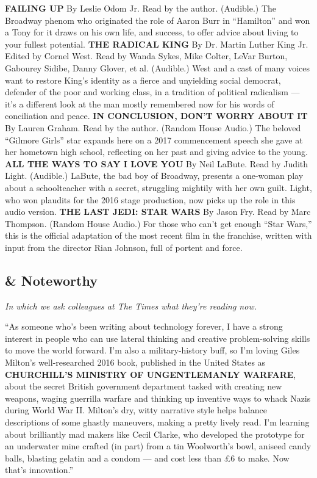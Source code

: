 \textbf{FAILING UP} By Leslie Odom Jr. Read by the author. (Audible.)
The Broadway phenom who originated the role of Aaron Burr in
``Hamilton'' and won a Tony for it draws on his own life, and success,
to offer advice about living to your fullest potential. \textbf{THE
RADICAL KING} By Dr. Martin Luther King Jr. Edited by Cornel West. Read
by Wanda Sykes, Mike Colter, LeVar Burton, Gabourey Sidibe, Danny
Glover, et al. (Audible.) West and a cast of many voices want to restore
King's identity as a fierce and unyielding social democrat, defender of
the poor and working class, in a tradition of political radicalism ---
it's a different look at the man mostly remembered now for his words of
conciliation and peace. \textbf{IN CONCLUSION, DON'T WORRY ABOUT IT} By
Lauren Graham. Read by the author. (Random House Audio.) The beloved
``Gilmore Girls'' star expands here on a 2017 commencement speech she
gave at her hometown high school, reflecting on her past and giving
advice to the young. \textbf{ALL THE WAYS TO SAY I LOVE YOU} By Neil
LaBute. Read by Judith Light. (Audible.) LaBute, the bad boy of
Broadway, presents a one-woman play about a schoolteacher with a secret,
struggling mightily with her own guilt. Light, who won plaudits for the
2016 stage production, now picks up the role in this audio version.
\textbf{THE LAST JEDI: STAR WARS} By Jason Fry. Read by Marc Thompson.
(Random House Audio.) For those who can't get enough ``Star Wars,'' this
is the official adaptation of the most recent film in the franchise,
written with input from the director Rian Johnson, full of portent and
force.

\hypertarget{-noteworthy}{%
\subsection{\& Noteworthy}\label{-noteworthy}}

\emph{In which we ask colleagues at The Times what they're reading now.}

``As someone who's been writing about technology forever, I have a
strong interest in people who can use lateral thinking and creative
problem-solving skills to move the world forward. I'm also a
military-history buff, so I'm loving Giles Milton's well-researched 2016
book, published in the United States as \textbf{CHURCHILL'S MINISTRY OF
UNGENTLEMANLY WARFARE}, about the secret British government department
tasked with creating new weapons, waging guerrilla warfare and thinking
up inventive ways to whack Nazis during World War II. Milton's dry,
witty narrative style helps balance descriptions of some ghastly
maneuvers, making a pretty lively read. I'm learning about brilliantly
mad makers like Cecil Clarke, who developed the prototype for an
underwater mine crafted (in part) from a tin Woolworth's bowl, aniseed
candy balls, blasting gelatin and a condom --- and cost less than £6 to
make. Now that's innovation.''

